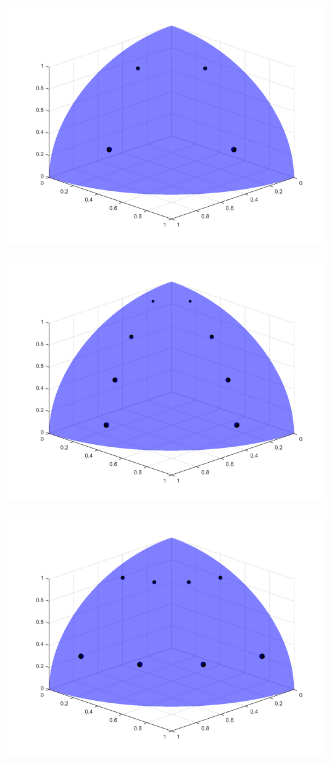 \begin{figure}
\centering
	\begin{subfigure}[b]{0.48\textwidth}
		\centering
		\includegraphics[width=0.92\textwidth]{figures/sec_Sn/PGLC2_2.png}
		\caption{}
	\end{subfigure}
	\hfill
	\begin{subfigure}[b]{0.48\textwidth}
		\centering
		\includegraphics[width=0.92\textwidth]{figures/sec_Sn/PGLC2_4.png}
		\caption{}
	\end{subfigure}
	\vfill
	\begin{subfigure}[b]{0.48\textwidth}
		\centering
		\includegraphics[width=0.92\textwidth]{figures/sec_Sn/PGLC4_2.png}

\end{subfigure}
\end{figure}
